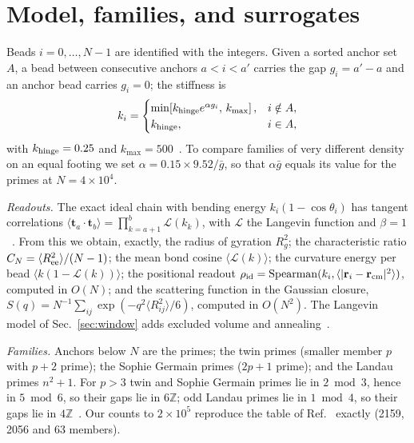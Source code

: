 \documentclass[reprint,amsmath,amssymb,aps,pre,longbibliography]{revtex4-2}
\begin{document}
\section{Model, families, and surrogates}\label{sec:model}

Beads $i=0,\dots,N-1$ are identified with the integers. Given a sorted anchor set $A$, a bead
between consecutive anchors $a<i<a'$ carries the gap $g_i=a'-a$ and an anchor bead carries
$g_i=0$; the stiffness is
\begin{equation}
k_i=\begin{cases}\min\!\left[k_{\rm hinge}e^{\alpha g_i},\,k_{\max}\right], & i\notin A,\\
k_{\rm hinge}, & i\in A,\end{cases}
\label{eq:stiff}
\end{equation}
with $k_{\rm hinge}=0.25$ and $k_{\max}=500$~\cite{PDTP4}. To compare families of very
different density on an equal footing we set $\alpha=0.15\times9.52/\bar g$, so that
$\alpha\bar g$ equals its value for the primes at $N=4\times10^4$.

\emph{Readouts.} The exact ideal chain with bending energy $k_i(1-\cos\theta_i)$ has tangent
correlations $\langle\mathbf t_a\cdot\mathbf t_b\rangle=\prod_{k=a+1}^{b}\mathcal L(k_k)$, with
$\mathcal L$ the Langevin function and $\beta=1$~\cite{PDTP4}. From this we obtain, exactly, the
radius of gyration $R_g^2$; the characteristic ratio $C_N=\langle R_{\rm ee}^2\rangle/(N-1)$; the
mean bond cosine $\langle\mathcal L(k)\rangle$; the curvature energy per bead
$\langle k(1-\mathcal L(k))\rangle$; the positional readout
$\rho_{\rm id}={\rm Spearman}(k_i,\langle|\mathbf r_i-\mathbf r_{\rm cm}|^2\rangle)$, computed in
$O(N)$; and the scattering function in the Gaussian closure,
$S(q)=N^{-1}\sum_{ij}\exp(-q^2\langle R_{ij}^2\rangle/6)$, computed in $O(N^2)$. The Langevin
model of Sec.~\ref{sec:window} adds excluded volume and annealing~\cite{PDTP4,WCA,Ermak}.

\emph{Families.} Anchors below $N$ are the primes; the twin primes (smaller member $p$ with
$p+2$ prime); the Sophie Germain primes ($2p+1$ prime); and the Landau primes $n^2+1$. For
$p>3$ twin and Sophie Germain primes lie in $2\bmod3$, hence in $5\bmod6$, so their gaps lie in
$6\mathbb Z$; odd Landau primes lie in $1\bmod4$, so their gaps lie in
$4\mathbb Z$~\cite[Ch.~37, Lemma~2.1]{LBCS}. Our counts to $2\times10^5$ reproduce the table of
Ref.~\cite[Ch.~37]{LBCS} exactly (2159, 2056 and 63 members).
\end{document}
